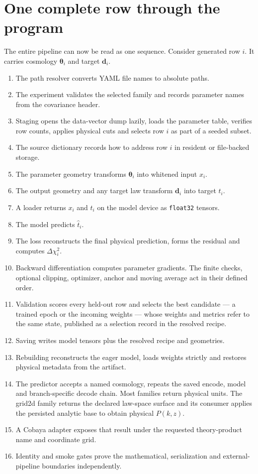 \documentclass[10pt,aps,prd,twocolumn,nofootinbib]{revtex4-2}
\newcommand{\code}[1]{\texttt{#1}}
\newcommand{\btheta}{\boldsymbol{\theta}}
\newcommand{\bd}{\mathbf{d}}
\begin{document}
\section{One complete row through the program}
\label{chap:trace}

The entire pipeline can now be read as one sequence.  Consider generated row
$i$.  It carries cosmology $\btheta_i$ and target $\bd_i$.

\begin{enumerate}
  \item The path resolver converts YAML file names to absolute paths.
  \item The experiment validates the selected family and records parameter
        names from the covariance header.
  \item Staging opens the data-vector dump lazily, loads the parameter table,
        verifies row counts, applies physical cuts and selects row $i$ as
        part of a seeded subset.
  \item The source dictionary records how to address row $i$ in resident or
        file-backed storage.
  \item The parameter geometry transforms $\btheta_i$ into whitened input
        $x_i$.
  \item The output geometry and any target law transform $\bd_i$ into target
        $t_i$.
  \item A loader returns $x_i$ and $t_i$ on the model device as
        \code{float32} tensors.
  \item The model predicts $\widehat t_i$.
  \item The loss reconstructs the final physical prediction, forms the
        residual and computes $\Delta\chi_i^2$.
  \item Backward differentiation computes parameter gradients.  The finite
        checks, optional clipping, optimizer, anchor and moving average act in
        their defined order.
  \item Validation scores every held-out row and selects the best candidate
        — a trained epoch or the incoming weights — whose weights and
        metrics refer to the same state, published as a selection record in
        the resolved recipe.
  \item Saving writes model tensors plus the resolved recipe and geometries.
  \item Rebuilding reconstructs the eager model, loads weights strictly and
        restores physical metadata from the artifact.
  \item The predictor accepts a named cosmology, repeats the saved encode,
        model and branch-specific decode chain.  Most families return physical
        units.  The grid2d family returns the declared law-space surface and its consumer
        applies the persisted analytic base to obtain physical $P(k,z)$.
  \item A Cobaya adapter exposes that result under the requested theory-product
        name and coordinate grid.
  \item Identity and smoke gates prove the mathematical, serialization and
        external-pipeline boundaries independently.
\end{enumerate}
\end{document}

